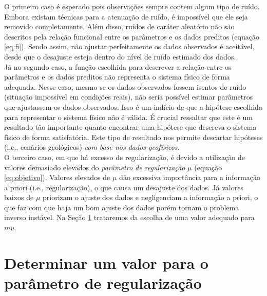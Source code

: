 \indent O primeiro caso é esperado pois observações sempre contem algum tipo de
ruído.
Embora existam técnicas para a atenuação de ruído, é impossível que ele seja
removido completamente.
Além disso, ruídos de caráter aleatório não são descritos pela relação funcional
entre os parâmetros e os dados preditos (equação \ref{eq:fi}).
Sendo assim, não ajustar perfeitamente os dados observados é aceitável, desde que
o desajuste esteja dentro do nível de ruído estimado dos dados.
\\
\indent Já no segundo caso, a função escolhida para descrever a relação entre os
pa\-râ\-me\-tros e os dados preditos não representa o sistema físico de forma adequada.
Nesse caso, mesmo se os dados observados fossem isentos de ruído (situação
impossível em condições reais), não seria possível estimar parâmetros que
ajustassem os dados observados. 
Isso é um indício de que a hipótese escolhida para representar o sistema físico
não é válida.
É crucial ressaltar que este é um resultado tão importante quanto encontrar uma
hipótese que descreva o sistema físico de forma satisfatória.
Este tipo de resultado nos permite descartar hipóteses (i.e., cenários geológicos)
{\it com base nos dados geofísicos}.
\\
\indent O terceiro caso, em que há excesso de regularização, é devido a utilização
de valores demasiado elevados do {\it parâmetro de regularização} $\mu$
(equação \ref{eq:objetivo}).
Valores elevados de $\mu$ dão excessiva importância para a informação a priori
(i.e., regularização), o que causa um desajuste dos dados.
Já valores baixos de $\mu$ priorizam o ajuste dos dados e negligenciam a informação
a priori, o que faz com que haja um bom ajuste dos dados porém tornam o problema
inverso instável. Na Seção \ref{sec:valor_mu} trataremos da escolha de uma
valor adequado para $mu$.

\section{Determinar um valor para o parâmetro de regularização}
\label{sec:valor_mu}

